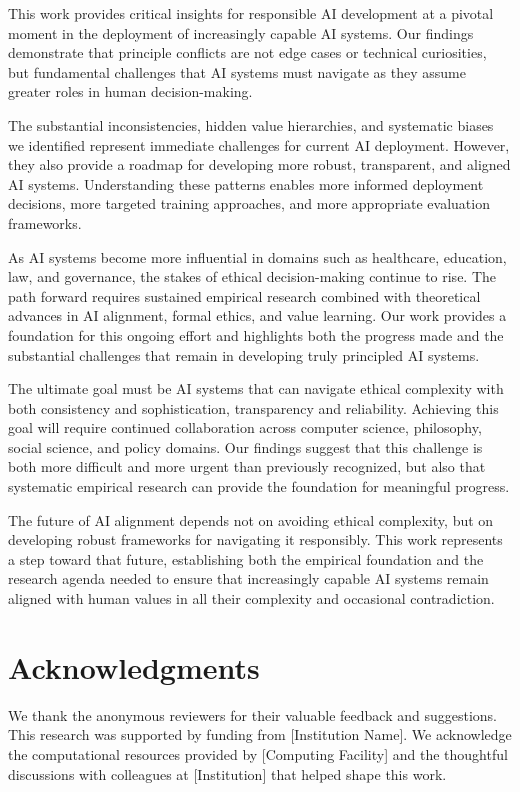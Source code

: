 \documentclass[11pt,a4paper]{article}
\begin{document}
This work provides critical insights for responsible AI development at a pivotal moment in the deployment of increasingly capable AI systems. Our findings demonstrate that principle conflicts are not edge cases or technical curiosities, but fundamental challenges that AI systems must navigate as they assume greater roles in human decision-making.

The substantial inconsistencies, hidden value hierarchies, and systematic biases we identified represent immediate challenges for current AI deployment. However, they also provide a roadmap for developing more robust, transparent, and aligned AI systems. Understanding these patterns enables more informed deployment decisions, more targeted training approaches, and more appropriate evaluation frameworks.

As AI systems become more influential in domains such as healthcare, education, law, and governance, the stakes of ethical decision-making continue to rise. The path forward requires sustained empirical research combined with theoretical advances in AI alignment, formal ethics, and value learning. Our work provides a foundation for this ongoing effort and highlights both the progress made and the substantial challenges that remain in developing truly principled AI systems.

The ultimate goal must be AI systems that can navigate ethical complexity with both consistency and sophistication, transparency and reliability. Achieving this goal will require continued collaboration across computer science, philosophy, social science, and policy domains. Our findings suggest that this challenge is both more difficult and more urgent than previously recognized, but also that systematic empirical research can provide the foundation for meaningful progress.

The future of AI alignment depends not on avoiding ethical complexity, but on developing robust frameworks for navigating it responsibly. This work represents a step toward that future, establishing both the empirical foundation and the research agenda needed to ensure that increasingly capable AI systems remain aligned with human values in all their complexity and occasional contradiction.

\section*{Acknowledgments}

We thank the anonymous reviewers for their valuable feedback and suggestions. This research was supported by funding from [Institution Name]. We acknowledge the computational resources provided by [Computing Facility] and the thoughtful discussions with colleagues at [Institution] that helped shape this work.
\end{document}
